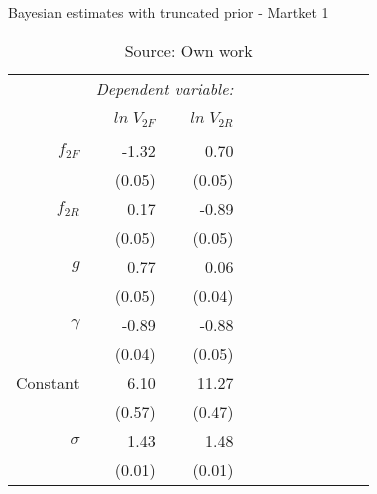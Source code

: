 \begin{table} [H]
\caption{Bayesian estimates with truncated prior - Martket 1}
\label{tbl:mkt1_T}
\centering
\begin{tabular}{rrrrrrrrrrr}
  \toprule 
 & \multicolumn{2}{c}{\textit{Dependent variable:}} \\ 
\cline{2-3} 
\\[-1.8ex] & $ln \; V_{2F}$ & $ln \; V_{2R}$ \\ 
\hline \\[-1.8ex] 

  $f_{2F}$ & -1.32 & 0.70 \\
  		   & (0.05)  & (0.05) \\
  $f_{2R}$ & 0.17 & -0.89 \\
  			& (0.05) &  (0.05) \\
  $g$ & 0.77 & 0.06 \\
  		& (0.05) & (0.04) \\
  $\gamma$ & -0.89 & -0.88 \\
  			& (0.04) & (0.05) \\
  Constant & 6.10 & 11.27 \\
  			& (0.57) & (0.47) \\
  \hline
  $\sigma$ & 1.43 & 1.48 \\
  		 & (0.01) & (0.01) \\
\bottomrule
\end{tabular}
\caption*{Source: Own work}
\end{table}
